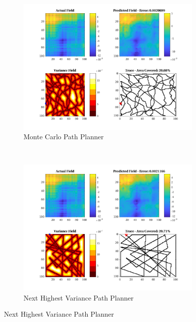 \begin{figure}[htb!]
    \centering
    \begin{subfigure}[t]{0.5\textwidth}
        \centering
        \includegraphics[width=\linewidth]{figures/hbresults/mc_20p_100x100_sf_50_seed_3.png}
        \captionsetup{skip=0.10\baselineskip,size=footnotesize}
        \caption{Monte Carlo Path Planner}
    \end{subfigure}%
    ~ 
    \begin{subfigure}[t]{0.5\textwidth}
        \centering
        \includegraphics[width=\linewidth]{figures/hbresults/nhv_20p_100x100_sf_50_seed_3.png}
        \captionsetup{skip=0.10\baselineskip,size=footnotesize}
        \caption{Next Highest Variance Path Planner}

\end{subfigure}
\end{figure}
